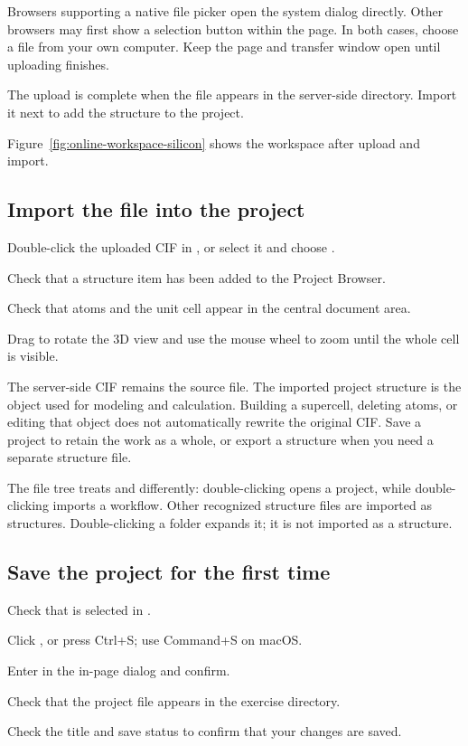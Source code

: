 Browsers supporting a native file picker open the system dialog directly. Other browsers may first show a selection button within the page. In both cases, choose a file from your own computer. Keep the page and transfer window open until uploading finishes.

The upload is complete when the file appears in the server-side directory. Import it next to add the structure to the project.

Figure~\ref{fig:online-workspace-silicon} shows the workspace after upload and import.

\subsection{Import the file into the project}

\begin{steps}
\item Double-click the uploaded CIF in , or select it and choose .
\item Check that a structure item has been added to the Project Browser.
\item Check that atoms and the unit cell appear in the central document area.
\item Drag to rotate the 3D view and use the mouse wheel to zoom until the whole cell is visible.
\end{steps}

The server-side CIF remains the source file. The imported project structure is the object used for modeling and calculation. Building a supercell, deleting atoms, or editing that object does not automatically rewrite the original CIF. Save a project to retain the work as a whole, or export a structure when you need a separate structure file.

The file tree treats  and  differently: double-clicking  opens a project, while double-clicking  imports a workflow. Other recognized structure files are imported as structures. Double-clicking a folder expands it; it is not imported as a structure.

\subsection{Save the project for the first time}

\begin{steps}
\item Check that  is selected in .
\item Click , or press Ctrl+S; use Command+S on macOS.
\item Enter  in the in-page dialog and confirm.
\item Check that the project file appears in the exercise directory.
\item Check the title and save status to confirm that your changes are saved.
\end{steps}

